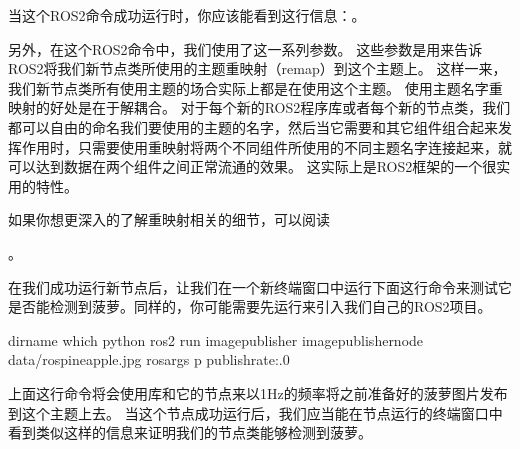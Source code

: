 \documentclass[letterpaper,10pt,english]{sphinxmanual}
\begin{document}
\sphinxAtStartPar
当这个ROS2命令成功运行时，你应该能看到这行信息：。

\sphinxAtStartPar
另外，在这个ROS2命令中，我们使用了这一系列参数。
这些参数是用来告诉ROS2将我们新节点类所使用的主题重映射（remap）到这个主题上。
这样一来，我们新节点类所有使用主题的场合实际上都是在使用这个主题。
使用主题名字重映射的好处是在于解耦合。
对于每个新的ROS2程序库或者每个新的节点类，我们都可以自由的命名我们要使用的主题的名字，然后当它需要和其它组件组合起来发挥作用时，只需要使用重映射将两个不同组件所使用的不同主题名字连接起来，就可以达到数据在两个组件之间正常流通的效果。
这实际上是ROS2框架的一个很实用的特性。

\sphinxAtStartPar
如果你想更深入的了解重映射相关的细节，可以阅读%
\begin{footnote}[96]\sphinxAtStartFootnote
{}
%
\end{footnote}。

\sphinxAtStartPar
在我们成功运行新节点后，让我们在一个新终端窗口中运行下面这行命令来测试它是否能检测到菠萝。同样的，你可能需要先运行来引入我们自己的ROS2项目。

\begin{sphinxVerbatim}[commandchars=\\\{\}]
dirname which python ros2 run image\PYGZus{}publisher image\PYGZus{}publisher\PYGZus{}node data/ros\PYGZhy{}pineapple.jpg \PYGZhy{}\PYGZhy{}ros\PYGZhy{}args \PYGZhy{}p publish\PYGZus{}rate:.0
\end{sphinxVerbatim}

\sphinxAtStartPar
上面这行命令将会使用库和它的节点来以1Hz的频率将之前准备好的菠萝图片发布到这个主题上去。
当这个节点成功运行后，我们应当能在节点运行的终端窗口中看到类似这样的信息来证明我们的节点类能够检测到菠萝。
\end{document}
